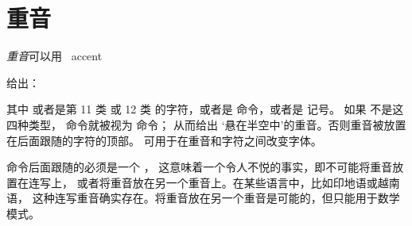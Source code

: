 \documentclass{book}
\begin{document}
\section{重音}

\emph{重音}可以用
~\csterm accent\par
\label{character} 给出：
\begin{disp}%
     \end{disp}
其中  或者是第 11 类 或 12 类
的字符，或者是  命令，或者是  记号。
如果  不是这四种类型， 命令就被视为  命令；
从而给出 `悬在半空中'的重音。否则重音被放置在后面跟随的字符的顶部。
 可用于在重音和字符之间改变字体。

 命令后面跟随的必须是一个 ，
这意味着一个令人不悦的事实，即不可能将重音放置在连写上，
或者将重音放在另一个重音上。在某些语言中，比如印地语或越南语，
这种连写重音确实存在。将重音放在另一个重音是可能的，但只能用于数学模式。
\end{document}
